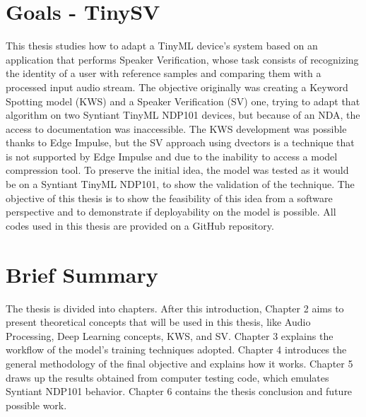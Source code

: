 \section{Goals - TinySV}
\label{sec:tinysv}
This thesis studies how to adapt a TinyML device's system based on an application that performs Speaker Verification, whose task consists of recognizing the identity of a user with reference samples and comparing them with a processed input audio stream. The objective originally was creating a Keyword Spotting model (KWS) and a Speaker Verification (SV) one, trying to adapt that algorithm on two Syntiant TinyML NDP101 devices, but because of an NDA, the access to documentation was inaccessible. The KWS development was possible thanks to Edge Impulse\cite{edgeimpulse_syntiant_tinyml}, but the SV approach\cite{dvector_extractor_TinySV} using dvectors is a technique that is not supported by Edge Impulse and due to the inability to access a model compression tool. To preserve the initial idea, the model was tested as it would be on a Syntiant TinyML NDP101, to show the validation of the technique. The objective of this thesis is to show the feasibility of this idea from a software perspective and to demonstrate if deployability on the model is possible. All codes used in this thesis are provided on a GitHub repository\footnotemark{}\cite{thesisresources}.

\section{Brief Summary}
The thesis is divided into chapters. After this introduction, Chapter 2 aims to present theoretical concepts that will be used in this thesis, like Audio Processing, Deep Learning concepts, KWS, and SV. Chapter 3 explains the workflow of the model's training techniques adopted. Chapter 4 introduces the general methodology of the final objective and explains how it works. Chapter 5 draws up the results obtained from computer testing code, which emulates Syntiant NDP101 behavior. Chapter 6 contains the thesis conclusion and future possible work.
\newpage